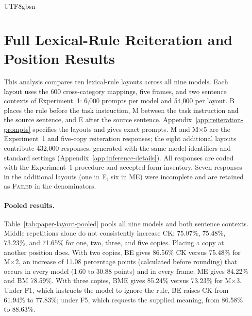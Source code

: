 \documentclass[11pt]{article}
\begin{document}
\begin{CJK*}{UTF8}{gbsn}

\section{Full Lexical-Rule Reiteration and Position Results}
\label{app:paper-position-repetition}

This analysis compares ten lexical-rule layouts across all nine models. Each
layout uses the 600 cross-category mappings, five frames, and two sentence
contexts of Experiment~1: 6,000 prompts per model and 54,000 per layout. B
places the rule before the task instruction, M between the task instruction and
the source sentence, and E after the source sentence.
Appendix~\ref{app:reiteration-prompts} specifies the layouts and gives exact
prompts. M and M$\times$5 are the Experiment~1 and five-copy reiteration
responses; the eight additional layouts contribute 432,000 responses, generated
with the same model identifiers and standard settings
(Appendix~\ref{app:inference-details}). All responses are coded with the
Experiment~1 procedure and accepted-form inventory. Seven responses in the
additional layouts (one in E, six in ME) were incomplete and are retained as
\textsc{Failed} in the denominators.

\paragraph{Pooled results.}
Table~\ref{tab:paper-layout-pooled} pools all nine models and both sentence
contexts. Middle repetitions alone do not consistently increase CK: 75.07\%, 75.48\%,
73.23\%, and 71.65\% for one, two, three, and five copies. Placing a copy at
another position does. With two copies, BE gives 86.56\% CK versus 75.48\% for
M$\times$2, an increase of 11.08 percentage points (calculated before rounding)
that occurs in every model (1.60 to 30.88 points) and in every frame; ME gives
84.22\% and BM 78.59\%. With three copies, BME gives 85.24\% versus 73.23\% for
M$\times$3. Under F1, which instructs the model to ignore the rule, BE raises CK
from 61.94\% to 77.83\%; under F5, which requests the supplied meaning, from
86.58\% to 88.63\%.


\end{CJK*}
\end{document}
